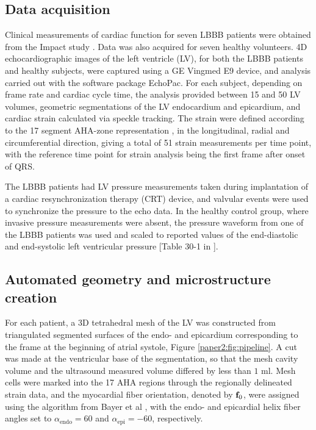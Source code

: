 \subsection{Data acquisition}
\label{paper2:sec:clinical_data}

Clinical measurements of cardiac function for seven LBBB patients were
obtained from the Impact study \cite{ImpactStudy2016}.
Data was also acquired for seven healthy volunteers. 4D echocardiographic
images of the left ventricle (LV), for both the LBBB patients and
healthy subjects, were captured using
a GE Vingmed E9 device, and analysis carried out with the
software package EchoPac. For each subject, depending on frame rate and cardiac cycle time, the
analysis provided between 15 and 50 LV volumes,  geometric segmentations of the LV
endocardium and epicardium, and cardiac strain calculated via speckle
tracking. The strain were defined according to
the 17 segment AHA-zone representation
\cite{cerqueira2002standardized}, in the longitudinal, radial and
circumferential direction, giving a total of 51 strain measurements
per time point, with the reference time point for strain analysis
  being the first frame after onset of QRS.

The LBBB patients had LV pressure measurements taken during
implantation of a cardiac resynchronization therapy (CRT) device, and
valvular events were used to synchronize the pressure to the echo
data. In the healthy control group, where invasive pressure measurements were
absent, the pressure waveform from one of the LBBB patients was used and
scaled to reported values of the end-diastolic and end-systolic
left ventricular pressure [Table 30-1 in \cite{klingensmith2008washington}].


\subsection{Automated geometry and microstructure creation}
For each patient, a 3D tetrahedral mesh of the LV was
constructed from triangulated segmented surfaces of the endo- and
epicardium corresponding to the frame at the beginning of
atrial systole, Figure \ref{paper2:fig:pipeline}. A cut was made at the
ventricular base of the segmentation, so that the mesh cavity volume
and the ultrasound measured volume differed by less than  $1$ ml. Mesh
cells were marked into the 17 AHA regions through the regionally
delineated strain data, and the myocardial fiber orientation, denoted
by $\mathbf{f}_0$, were assigned using the algorithm from Bayer et al \cite{bayer2012novel},
with the endo- and epicardial helix fiber angles set to
$\alpha_{\text{endo}} = 60$ and $\alpha_{\text{epi}} = -60$, respectively.

